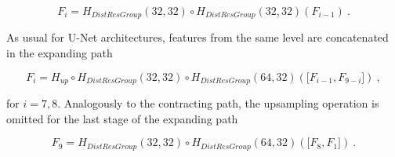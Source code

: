     $$ F_{i} = H_{DistResGroup}(32, 32) \circ H_{DistResGroup}(32, 32)(F_{i-1}) ~.$$

As usual for U-Net architectures, 
features from the same level are concatenated in the expanding path

    $$F_{i} = H_{up} \circ H_{DistResGroup}(32, 32) \circ H_{DistResGroup}(64, 32) \left( \big[ F_{i-1}, F_{9-i} \big] \right) ~, $$

for $i = 7, 8$. Analogously to the contracting path, the upsampling operation is omitted for the last stage of the expanding path

    $$F_{9} = H_{DistResGroup}(32, 32) \circ H_{DistResGroup}(64, 32) \left( \big[ F_{8}, F_{1} \big] \right) ~. $$
